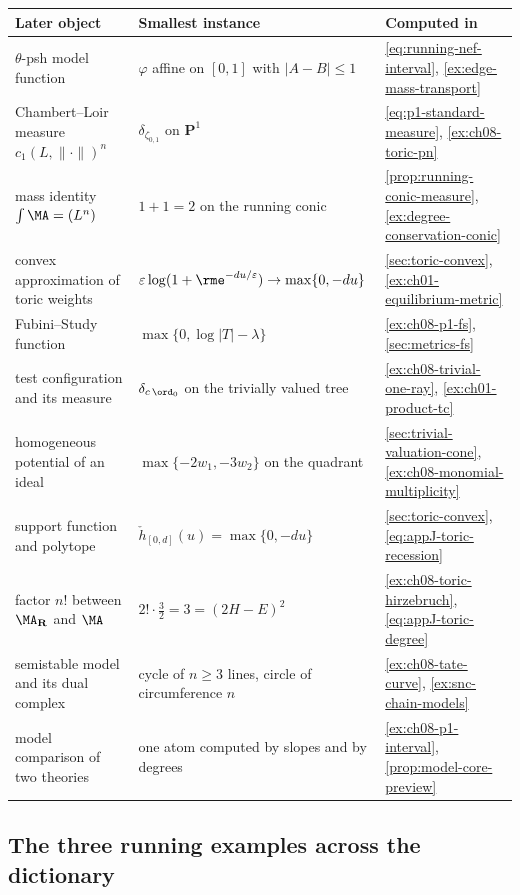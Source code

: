 \begin{center}
\small
\begin{tabular}{p{}|p{}|p{}}
\textbf{Later object}&\textbf{Smallest instance}&\textbf{Computed in}\\ \hline
$\theta$-psh model function
  &$\varphi$ affine on $[0,1]$ with $|A-B|\leq1$
  &\eqref{eq:running-nef-interval},
   \cref{ex:edge-mass-transport}\\
Chambert--Loir measure $c_1(L,\|\cdot\|)^n$
  &$\delta_{\zeta_{0,1}}$ on $\mathbf P^1$
  &\eqref{eq:p1-standard-measure},
   \cref{ex:ch08-toric-pn}\\
mass identity $\int\MA=(L^n)$
  &$1+1=2$ on the running conic
  &\cref{prop:running-conic-measure},
   \cref{ex:degree-conservation-conic}\\
convex approximation of toric weights
  &$\varepsilon\log(1+\rme^{-du/\varepsilon})\to\max\{0,-du\}$
  &\cref{sec:toric-convex},
   \cref{ex:ch01-equilibrium-metric}\\
Fubini--Study function
  &$\max\{0,\log|T|-\lambda\}$
  &\cref{ex:ch08-p1-fs},
   \cref{sec:metrics-fs}\\
test configuration and its measure
  &$\delta_{c\,\ord_0}$ on the trivially valued tree
  &\cref{ex:ch08-trivial-one-ray},
   \cref{ex:ch01-product-tc}\\
homogeneous potential of an ideal
  &$\max\{-2w_1,-3w_2\}$ on the quadrant
  &\cref{sec:trivial-valuation-cone},
   \cref{ex:ch08-monomial-multiplicity}\\
support function and polytope
  &$\check h_{[0,d]}(u)=\max\{0,-du\}$
  &\cref{sec:toric-convex},
   \eqref{eq:appJ-toric-recession}\\
factor $n!$ between $\MA_{\mathbf R}$ and $\MA$
  &$2!\cdot\tfrac32=3=(2H-E)^2$
  &\cref{ex:ch08-toric-hirzebruch},
   \eqref{eq:appJ-toric-degree}\\
semistable model and its dual complex
  &cycle of $n\geq3$ lines, circle of circumference $n$
  &\cref{ex:ch08-tate-curve},
   \cref{ex:snc-chain-models}\\
model comparison of two theories
  &one atom computed by slopes and by degrees
  &\cref{ex:ch08-p1-interval},
   \cref{prop:model-core-preview}
\end{tabular}
\end{center}

\subsection{The three running examples across the dictionary}
\label{sec:ch08-dict-running}

